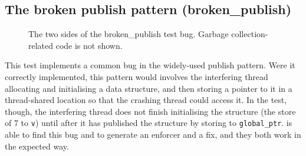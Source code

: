 \subsection{The broken publish pattern (broken\_publish)}

\begin{figure}
  {\hfill}
  {\hfill}
  {\hfill}
  \caption{The two sides of the broken\_publish test bug.  Garbage
    collection-related code is not shown.}
  \label{fig:eval:broken_publish}
\end{figure}

This test implements a common bug in the widely-used publish
pattern\needCite{}.  Were it correctly implemented, this pattern would
involves the interfering thread allocating and initialising a data
structure, and then storing a pointer to it in a thread-shared
location so that the crashing thread could access it.  In the test,
though, the interfering thread does not finish initialising the
structure (the store of 7 to \texttt{v}) until after it has published
the structure by storing to \texttt{global\_ptr}.  {\Implementation}
is able to find this bug and to generate an enforcer and a fix, and
they both work in the expected way.

